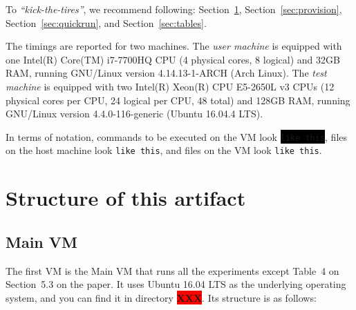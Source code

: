 \documentclass[12pt]{article}
\newcommand{\command}[1]{\colorbox{black}{\texttt{\color{white}#1}}}
\newcommand{\host}[1]{\colorbox{blue!20}{\texttt{\color{black}#1}}}
\newcommand{\vm}[1]{\colorbox{green!20}{\texttt{\color{black}#1}}}
\newcommand{\XXX}{\colorbox{red}{\bf\color{white}XXX}}
\begin{document}
To \emph{``kick-the-tires''}, we recommend following:
Section~\ref{sec:structure}, Section~\ref{sec:provision},
Section~\ref{sec:quickrun}, and Section~\ref{sec:tables}.

The timings are reported for two machines.  The \emph{user machine} is equipped
with one Intel(R) Core(TM) i7-7700HQ CPU (4 physical cores, 8 logical) and 32GB
RAM, running GNU/Linux version 4.14.13-1-ARCH (Arch Linux).  The \emph{test
machine} is equipped with two Intel(R) Xeon(R) CPU E5-2650L v3 CPUs (12 physical
cores per CPU, 24 logical per CPU, 48 total) and 128GB RAM, running GNU/Linux
version 4.4.0-116-generic (Ubuntu 16.04.4 LTS).

In terms of notation, commands to be executed on the VM look \command{like
this}, files on the host machine look \host{like this}, and files on the VM look
\vm{like this}.

\section{Structure of this artifact}
\label{sec:structure}

\subsection{Main VM}
\label{sec:main}

The first VM is the Main VM that runs all the experiments except Table~4 on
Section~5.3 on the paper.  It uses Ubuntu 16.04 LTS as the underlying operating
system, and you can find it in directory \XXX.  Its structure is as follows:
\end{document}
